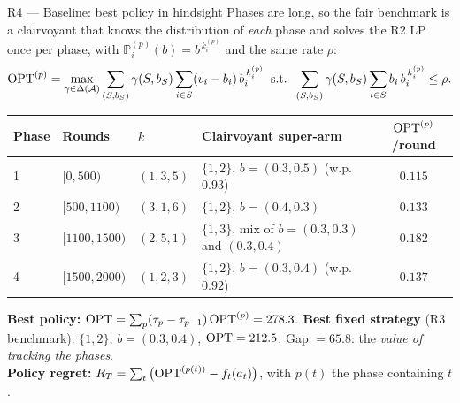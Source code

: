 \documentclass[12pt,aspectratio=169]{beamer}
\begin{document}
\begin{frame}{R4 --- Baseline: best policy in hindsight}
\scriptsize
Phases are long, so the fair benchmark is a clairvoyant that knows the distribution of \emph{each}
phase and solves the R2 LP once per phase, with $\mathbb P^{(p)}_i(b)=b^{\,k_i^{(p)}}$ and the same rate $\rho$:
\vspace{-0.1cm}
\[
  \mathrm{OPT}^{(p)}=\max_{\gamma\in\Delta(\mathcal A)}\sum_{(S,b_S)}\gamma(S,b_S)\sum_{i\in S}(v_i-b_i)\,b_i^{\,k_i^{(p)}}
  \;\;\text{s.t.}\;\;\sum_{(S,b_S)}\gamma(S,b_S)\sum_{i\in S}b_i\,b_i^{\,k_i^{(p)}}\le\rho .
\]
\vspace{-0.25cm}
\begin{center}
\renewcommand{\arraystretch}{1.05}
\begin{tabular}{@{}llllc@{}}
  \toprule
  Phase & Rounds & $k$ & Clairvoyant super-arm & $\mathrm{OPT}^{(p)}$/round\\
  \midrule
  1 & $[0,500)$     & $(1,3,5)$ & $\{1,2\}$, $b=(0.3,0.5)$ (w.p.\ $0.93$)      & $0.115$\\
  2 & $[500,1100)$  & $(3,1,6)$ & $\{1,2\}$, $b=(0.4,0.3)$                     & $0.133$\\
  3 & $[1100,1500)$ & $(2,5,1)$ & $\{1,3\}$, mix of $b=(0.3,0.3)$ and $(0.3,0.4)$ & $0.182$\\
  4 & $[1500,2000)$ & $(1,2,3)$ & $\{1,2\}$, $b=(0.3,0.4)$ (w.p.\ $0.92$)      & $0.137$\\
  \bottomrule
\end{tabular}
\end{center}
\vspace{-0.15cm}
\textbf{Best policy:} $\mathrm{OPT}=\sum_p(\tau_p-\tau_{p-1})\,\mathrm{OPT}^{(p)}=278.3$.\quad
\textbf{Best fixed strategy} (R3 benchmark): $\{1,2\}$, $b=(0.3,0.4)$, $\mathrm{OPT}=212.5$.\quad
Gap $=65.8$: the \emph{value of tracking the phases}.\\
\textbf{Policy regret:} $R_T=\sum_t\big(\mathrm{OPT}^{(p(t))}-f_t(a_t)\big)$, with $p(t)$ the phase containing $t$.
\end{frame}
\end{document}
